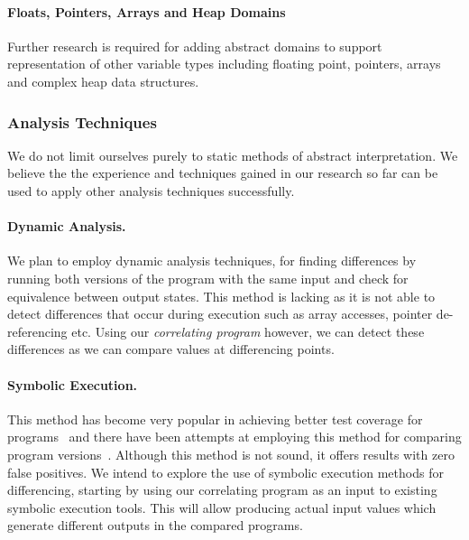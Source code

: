 \paragraph{Floats, Pointers, Arrays and Heap Domains}
Further research is required for adding abstract domains to support representation of other variable types including floating point, pointers, arrays and complex heap data structures.


\subsubsection{Analysis Techniques}
We do not limit ourselves purely to static methods of abstract interpretation. We believe the the experience and techniques gained in our research so far can be used to apply other analysis techniques successfully.

\paragraph{Dynamic Analysis.} We plan to employ dynamic analysis techniques,
    for finding differences by running both versions of the program with
    the same input and check for equivalence between output states. This
    method is lacking as it is not able to detect differences that occur
    during execution such as array accesses, pointer de-referencing etc. Using our \emph{correlating program} however, we
    can detect these differences as we can compare values at differencing
    points.

\paragraph{Symbolic Execution.} This method has become very popular in
    achieving better test coverage for
    programs~\cite{CadarDunbarEngler08} and there have been attempts at
    employing this method for comparing program
    versions~\cite{EnglerRamos11, HawblitzelKawaguchiLahiriRebelo12,DwyerElbaumPerson08}.
    Although this method is not sound, it offers results with zero false
    positives. We intend to explore the use of symbolic execution methods
    for differencing, starting by using our correlating program as an
    input to existing symbolic execution tools. This will allow producing actual input values which generate different outputs in the compared programs.

